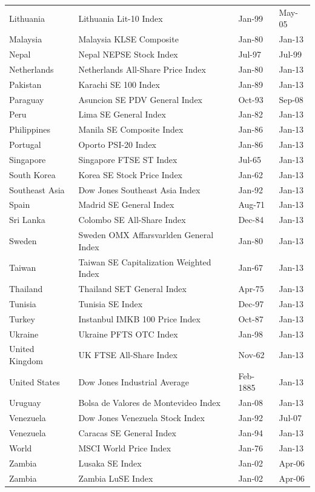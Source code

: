 \documentclass[12pt,final,fleqn]{article}
\theoremstyle{plain}
\begin{document}
\begin{center}
\begin{longtable}[!ht]{l@{\extracolsep{\fill}}lll}
Lithuania & Lithuania Lit-10 Index & Jan-99 & May-05\\
Malaysia & Malaysia KLSE Composite & Jan-80 & Jan-13\\
Nepal & Nepal NEPSE Stock Index & Jul-97 & Jul-99\\
Netherlands & Netherlands All-Share Price Index & Jan-80 & Jan-13\\
Pakistan & Karachi SE 100 Index & Jan-89 & Jan-13\\
Paraguay & Asuncion SE PDV General Index & Oct-93 & Sep-08\\
Peru & Lima SE General Index & Jan-82 & Jan-13\\
Philippines & Manila SE Composite Index & Jan-86 & Jan-13\\
Portugal & Oporto PSI-20 Index & Jan-86 & Jan-13\\
Singapore & Singapore FTSE ST Index & Jul-65 & Jan-13\\
South Korea & Korea SE Stock Price Index  & Jan-62 & Jan-13\\
Southeast Asia & Dow Jones Southeast Asia Index & Jan-92 & Jan-13\\
Spain & Madrid SE General Index & Aug-71 & Jan-13\\
Sri Lanka & Colombo SE All-Share Index & Dec-84 & Jan-13\\
Sweden & Sweden OMX Affarsvarlden General Index & Jan-80 & Jan-13\\
Taiwan & Taiwan SE Capitalization Weighted Index & Jan-67 & Jan-13\\
Thailand & Thailand SET General Index & Apr-75 & Jan-13\\
Tunisia & Tunisia SE Index & Dec-97 & Jan-13\\
Turkey & Instanbul IMKB 100 Price Index & Oct-87 & Jan-13\\
Ukraine & Ukraine PFTS OTC Index & Jan-98 & Jan-13\\
United Kingdom & UK FTSE All-Share Index & Nov-62 & Jan-13\\
United States & Dow Jones Industrial Average & Feb-1885 & Jan-13\\
Uruguay & Bolsa de Valores de Montevideo Index & Jan-08 & Jan-13\\
Venezuela & Dow Jones Venezuela Stock Index & Jan-92 & Jul-07\\
Venezuela & Caracas SE General Index & Jan-94 & Jan-13\\
World & MSCI World Price Index & Jan-76 & Jan-13\\
Zambia & Lusaka SE Index & Jan-02 & Apr-06\\
Zambia & Zambia LuSE Index & Jan-02 & Apr-06\\
\hline
\hline
\end{longtable}
\end{center}
\doublespacing
\normalsize
\end{document}
